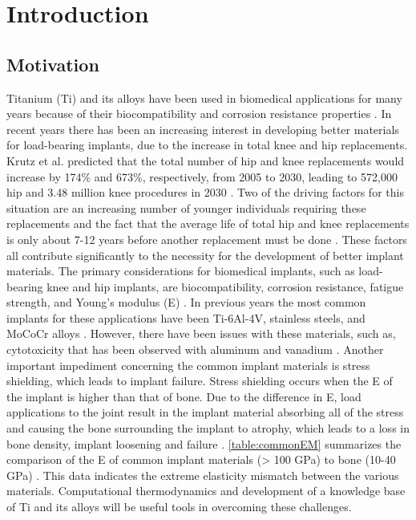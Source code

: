 \vspace*{-80mm}
\chapter{Introduction} \label{chapter1:introduction}

\section{\sloppy Motivation}
Titanium (Ti) and its alloys have been used in biomedical applications for many years because of their biocompatibility and corrosion resistance properties \cite{Long1998a}. In recent years there has been an increasing interest in developing better materials for load-bearing implants, due to the increase in total knee and hip replacements. Krutz et al. predicted that the total number of hip and knee replacements would increase by 174\% and 673\%, respectively, from 2005 to 2030, leading to 572,000 hip and 3.48 million knee procedures in 2030 \cite{Kurtz2007}. Two of the driving factors for this situation are an increasing number of younger individuals requiring these replacements and the fact that the average life of total hip and knee replacements is only about 7-12 years before another replacement must be done \cite{Krishna2007a}. These factors all contribute significantly to the necessity for the development of better implant materials. The primary considerations for biomedical implants, such as load-bearing knee and hip implants, are biocompatibility, corrosion resistance, fatigue strength, and Young’s modulus (E) \cite{Long1998a}. In previous years the most common implants for these applications have been Ti-6Al-4V, stainless steels, and MoCoCr alloys \cite{Niinomi2003,Niinomi2012}. However, there have been issues with these materials, such as, cytotoxicity that has been observed with aluminum and vanadium \cite{Ito1995a}. Another important impediment concerning the common implant materials is stress shielding, which leads to implant failure. Stress shielding occurs when the E of the implant is higher than that of bone. Due to the difference in E, load applications to the joint result in the implant material absorbing all of the stress and causing the bone surrounding the implant to atrophy, which leads to a loss in bone density, implant loosening and failure \cite{Long1998a}.  \ref{table:commonEM} summarizes the comparison of the E of common implant materials (> 100 GPa) to bone (10-40 GPa) \cite{Long1998a}. This data indicates the extreme elasticity mismatch between the various materials. Computational thermodynamics and development of a knowledge base of Ti and its alloys will be useful tools in overcoming these challenges.


